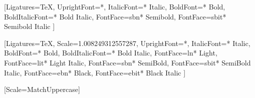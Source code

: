 \usepackage[margin=0.75in]{geometry}

\usepackage{fontspec}
\setmainfont{Arno Pro}
  [Ligatures=TeX,
   UprightFont=*,
   ItalicFont={* Italic},
   BoldFont={* Bold},
   BoldItalicFont={* Bold Italic},
   FontFace={sb}{n}{* Semibold},
   FontFace={sb}{it}{* Semibold Italic}
   ]
\DeclareRobustCommand{\sbseries}{\fontseries{sb}\selectfont}
\DeclareTextFontCommand{\textsb}{\sbseries}

\setsansfont{Source Sans Pro}
  [Ligatures=TeX,
   Scale=1.008249312557287,
   UprightFont=*,
   ItalicFont={* Italic},
   BoldFont={* Bold},
   BoldItalicFont={* Bold Italic},
   FontFace={l}{n}{* Light},
   FontFace={l}{it}{* Light Italic},
   FontFace={sb}{n}{* SemiBold},
   FontFace={sb}{it}{* SemiBold Italic},
   FontFace={eb}{n}{* Black},
   FontFace={eb}{it}{* Black Italic}
  ]
\DeclareRobustCommand{\ltseries}{\fontseries{l}\selectfont}
\DeclareTextFontCommand{\textlt}{\ltseries}
\DeclareRobustCommand{\ebseries}{\fontseries{eb}\selectfont}
\DeclareTextFontCommand{\texteb}{\ebseries}

\setmonofont{IBM Plex Mono Regular}[Scale=MatchUppercase]

\usepackage[dvipsnames]{xcolor}

\usepackage{titling}
\pretitle{\begin{center}\Large\sffamily\bfseries\color{themecolour}}
\posttitle{\par\end{center}\vspace{20ex}}
\preauthor{\begin{center}\vspace{15\baselineskip}\large}
\postauthor{\normalsize\end{center}\vspace{-5ex}}
\predate{\begin{center}\large}
\postdate{\end{center}\normalsize}

